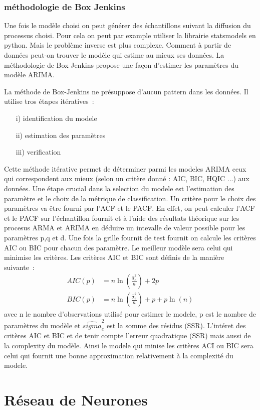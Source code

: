 \documentclass[11pt]{scrartcl} %
\begin{document}
\subsubsection{méthodologie de Box Jenkins}
Une fois le modèle choisi on peut générer des échantillons suivant la diffusion du processus choisi. Pour cela on peut par example utiliser la librairie statsmodels en python. Mais le problème inverse est plus complexe. Comment à partir de données peut-on trouver le modèle qui estime au mieux ses données. La méthodologie de Box Jenkins propose une façon d'estimer les paramètres du modèle ARIMA.


La méthode de Box-Jenkins \cite{BoxJenkins} ne présuppose d'aucun pattern dans les données. Il utilise tros étapes itératives~:
\begin{itemize}
\item[i)] identification du modele
\item[ii)] estimation des paramètres
\item[iii)] verification
\end{itemize}
Cette méthode itérative permet de déterminer parmi les modeles ARIMA ceux qui correspondent aux mieux (selon un critère donné : AIC, BIC, HQIC ...) aux données.
Une étape crucial dans la selection du modele est l'estimation des paramètre et le choix de la métrique de classification. Un critère pour le choix des paramètres va être fourni par l'ACF et le PACF. En effet, on peut calculer l'ACF et le PACF sur l'échantillon fournit et à l'aide des résultats théorique sur les procesus ARMA et ARIMA en déduire un intevalle de valeur possible pour les paramètres p,q et d. Une fois la grille fournit de test fournit on calcule les critères AIC ou BIC pour chacun des paramètre. Le meilleur modèle sera celui qui minimise les critères. Les critères AIC et BIC sont définis de la manière suivante~:
\begin{align*}
AIC(p)&=n\ln\left({\frac{\hat{\sigma}_e^2}{n}}\right)+2p\\
BIC(p)&=n\ln\left({\frac{\hat{\sigma}_e^2}{n}}\right)+p+p\ln(n)
\end{align*}
avec n le nombre d'observations utilisé pour estimer le modele, p est le nombre de paramètres du modèle et $\hat{sigma}_e^2$ est la somme des résidus (SSR). L'intéret des critères AIC et BIC et de tenir compte l'erreur quadratique (SSR) mais aussi de la complexity du modèle. Ainsi le modele qui minise les critères ACI ou BIC sera celui qui fournit une bonne approximation relativement à la complexité du modele.
\section{Réseau de Neurones}
\end{document}
